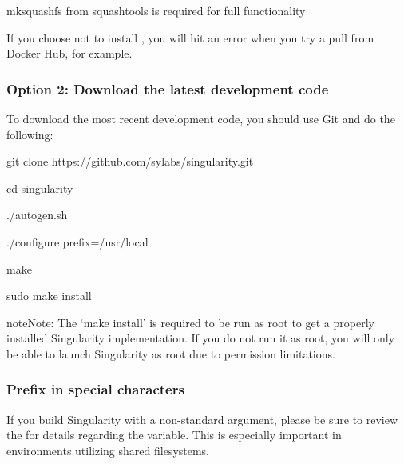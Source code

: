 \documentclass[letterpaper,10pt,english]{sphinxmanual}
\begin{document}
%
\begin{sphinxVerbatim}[commandchars=\\\{\}]
mksquashfs from squash\PYGZhy{}tools is required for full functionality
\end{sphinxVerbatim}

If you choose not to install , you will hit an error when you try a pull from Docker Hub, for example.


\subsubsection{Option 2: Download the latest development code}
\label{\detokenize{installation:option-2-download-the-latest-development-code}}
To download the most recent development code, you should use Git and do the following:

%
\begin{sphinxVerbatim}[commandchars=\\\{\}]
git clone https://github.com/sylabs/singularity.git

cd singularity

./autogen.sh

./configure \PYGZhy{}\PYGZhy{}prefix=/usr/local

make

sudo make install
\end{sphinxVerbatim}

\begin{sphinxadmonition}{note}{Note:}
The ‘make install’ is required to be run as root to get a properly installed Singularity implementation. If you do not run it as root, you will only be able to launch Singularity as root due to permission limitations.
\end{sphinxadmonition}


\subsubsection{Prefix in special characters}
\label{\detokenize{installation:prefix-in-special-characters}}
If you build Singularity with a non-standard  argument, please be sure to review the  for details regarding the  variable. This is especially important in environments utilizing shared filesystems.
\end{document}
